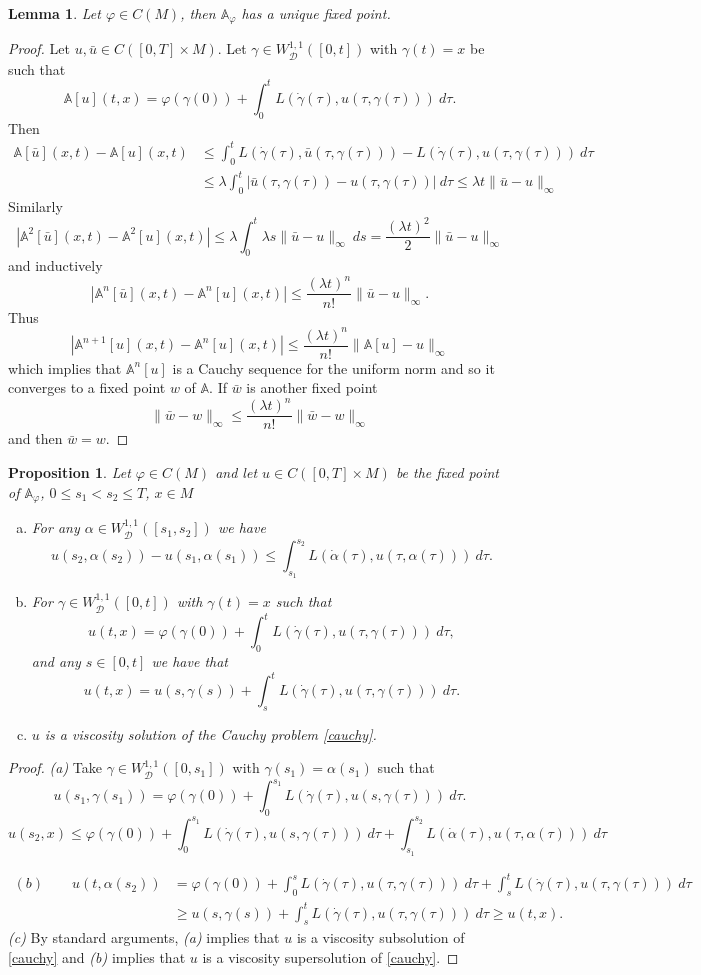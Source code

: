 \documentclass[12pt]{amsart}
\theoremstyle{plain}
\newtheorem{lemma}{Lemma}
\newtheorem{proposition}{Proposition}
\theoremstyle{definition}
\newcommand{\A}{\mathbb A}
\newcommand{\cD}{\mathcal D}
\newcommand{\cW}{W^{1,1}}
\newcommand{\cWD}{\cW_\cD}
\newcommand{\ub}{\bar{u}}
\newcommand{\af}{\alpha}
\newcommand{\fui}{\varphi}
\newcommand{\ga}{\gamma}
\newcommand{\la}{\lambda}
\newcommand{\dga}{\dot\gamma}
\begin{document}
\begin{lemma}\label{A-fix}
 Let $\fui\in C(M)$, then $\A_\fui$ has a unique fixed point.
\end{lemma}
\begin{proof}
  Let $u,\ub\in C([0,T]\times M)$.
  Let $\ga\in\cWD([0,t])$ with $\ga(t)=x$ be such that
  \[\A[u](t,x)=\fui(\ga(0))+\int_0^tL(\dga(\tau),u(\tau,\ga(\tau)))\ d\tau.\]
  Then
  \begin{align*}
     \A[\ub](x,t)-\A[u](x,t)&\le \int_0^tL(\dga(\tau),\ub(\tau,\ga(\tau)))-L(\dga(\tau),u(\tau,\ga(\tau)))\ d\tau\\
&\le \la\int_0^t|\ub(\tau,\ga(\tau))-u(\tau,\ga(\tau))|\ d\tau\le \la t\|\ub-u\|_\infty 
  \end{align*}
  Similarly
 \[|\A^2[\ub](x,t)-\A^2[u](x,t)|\le  \la\int_0^t \la s\|\ub-u\|_\infty\ ds=\frac{(\la t)^2}2\|\ub-u\|_\infty\]
 and inductively
 \[|\A^n[\ub](x,t)-\A^n[u](x,t)|\le \frac{(\la t)^n}{n!}\|\ub-u\|_\infty.\]
 Thus
 \[|\A^{n+1}[u](x,t)-\A^n[u](x,t)|\le \frac{(\la t)^n}{n!}\|\A[u]-u\|_\infty\]
 which implies that $\A^n[u]$ is a Cauchy sequence for the uniform
 norm and so it converges to a fixed point $w$ of $\A$. If $\bar w$ is
 another fixed point
 \[\|\bar w-w\|_\infty\le \frac{(\la t)^n}{n!}\|\bar w-w\|_\infty\]
and then $\bar w=w$. 
\end{proof}
\begin{proposition}\label{fix=sol}
Let $\fui\in C(M)$ and let $u\in C([0,T]\times M)$ be the fixed point of
$\A_\fui$, $0\le s_1<s_2\le T$, $x\in M$
\begin{enumerate}[(a)]
\item For any $\af\in\cWD([s_1,s_2])$ we have
  \[u(s_2, \af(s_2))-u(s_1,\af(s_1))\le
    \int_{s_1}^{s_2}L(\dot\af(\tau),u(\tau,\af(\tau)))\ d\tau.\]
\item For $\ga\in\cWD([0,t])$ with $\ga(t)=x$ such that
  \[u(t,x)=\fui(\ga(0))+\int_0^tL(\dga(\tau),u(\tau,\ga(\tau)))\ d\tau,\]
  and any $s\in[0,t]$ we have that
  \[u(t,x)=u(s,\ga(s))+\int_s^tL(\dga(\tau),u(\tau,\ga(\tau)))\ d\tau.\]
\item $u$ is a viscosity solution of the Cauchy problem \eqref{cauchy}.
  \end{enumerate}
\end{proposition}
\begin{proof}
  {\it (a)} Take $\ga\in\cWD([0,s_1])$ with $\ga(s_1)=\af(s_1)$ such that
  \[u(s_1,\ga(s_1))=\fui(\ga(0))+\int_0^{s_1}L(\dga(\tau),u(s,\ga(\tau)))\ d\tau.\]
\[u(s_2,x)\le \fui(\ga(0))+\int_0^{s_1}L(\dga(\tau),u(s,\ga(\tau)))\ d\tau+
\int_{s_1}^{s_2}L(\dot\af(\tau),u(\tau,\af(\tau)))\ d\tau\]
  
  \begin{align*}(b)\qquad
    u(t,\af(s_2))&=\fui(\ga(0))+\int_0^sL(\dga(\tau),u(\tau,\ga(\tau)))\ d\tau
  +\int_s^tL(\dga(\tau),u(\tau,\ga(\tau)))\ d\tau\\
  &\ge u(s,\ga(s))+\int_s^tL(\dga(\tau),u(\tau,\ga(\tau)))\ d\tau\ge u(t,x).
    \end{align*}
{\it (c)} By standard arguments, {\it (a)} implies that $u$ is a
    viscosity subsolution of \eqref{cauchy} and {\it (b)} implies
    that $u$ is a viscosity supersolution of \eqref{cauchy}.
  \end{proof}
\end{document}
